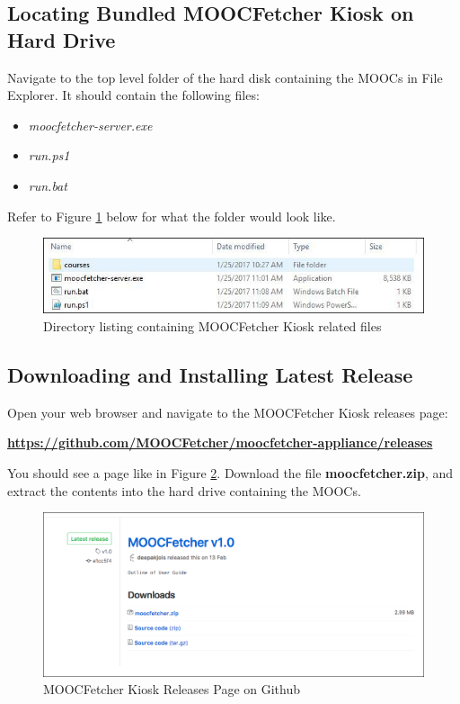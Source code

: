 \documentclass[]{article}
\providecommand{\tightlist}{%
  \setlength{\itemsep}{0pt}\setlength{\parskip}{0pt}}
\begin{document}
\subsection{Locating Bundled MOOCFetcher Kiosk on Hard
Drive}\label{locating-bundled-moocfetcher-kiosk-on-hard-drive}

Navigate to the top level folder of the hard disk containing the MOOCs
in File Explorer. It should contain the following files:

\begin{itemize}
\tightlist
\item
  \emph{moocfetcher-server.exe}
\item
  \emph{run.ps1}
\item
  \emph{run.bat}
\end{itemize}

Refer to Figure \ref{moocfroot} below for what the folder would look
like.

\begin{figure}
\centering
\includegraphics{moocfroot.jpg}
\caption{Directory listing containing MOOCFetcher Kiosk related files
\label{moocfroot}}
\end{figure}

\subsection{Downloading and Installing Latest
Release}\label{downloading-and-installing-latest-release}

Open your web browser and navigate to the MOOCFetcher Kiosk releases
page:

\textbf{\url{https://github.com/MOOCFetcher/moocfetcher-appliance/releases}}

You should see a page like in Figure \ref{releases}. Download the file
\textbf{moocfetcher.zip}, and extract the contents into the hard drive
containing the MOOCs.

\begin{figure}
\centering
\includegraphics{releases.jpg}
\caption{MOOCFetcher Kiosk Releases Page on Github \label{releases}}
\end{figure}
\end{document}
